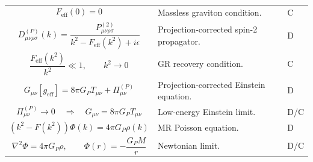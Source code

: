 \documentclass[11pt]{article}
\newcommand{\eff}{\mathrm{eff}}
\begin{document}
\begin{longtable}{>{\raggedright\arraybackslash}p{} >{\raggedright\arraybackslash}p{} >{\centering\arraybackslash}p{}}
\begin{equation}
F_{\eff}(0)=0
\end{equation}
& Massless graviton condition. & C \\

\begin{equation}
D_{\mu\nu\rho\sigma}^{(P)}(k)=\frac{P^{(2)}_{\mu\nu\rho\sigma}}{k^2-F_{\eff}(k^2)+i\epsilon}
\end{equation}
& Projection-corrected spin-2 propagator. & D \\

\begin{equation}
\frac{F_{\eff}(k^2)}{k^2}\ll1,\qquad k^2\rightarrow0
\end{equation}
& GR recovery condition. & C \\

\begin{equation}
G_{\mu\nu}[g_{\eff}]=8\pi G_P T_{\mu\nu}+\Pi_{\mu\nu}^{(P)}
\end{equation}
& Projection-corrected Einstein equation. & D \\

\begin{equation}
\Pi_{\mu\nu}^{(P)}\rightarrow0\quad\Rightarrow\quad G_{\mu\nu}=8\pi G_PT_{\mu\nu}
\end{equation}
& Low-energy Einstein limit. & D/C \\

\begin{equation}
(k^2-F(k^2))\Phi(k)=4\pi G_P\rho(k)
\end{equation}
& MR Poisson equation. & D \\

\begin{equation}
\nabla^2\Phi=4\pi G_P\rho,
\qquad
\Phi(r)=-\frac{G_PM}{r}
\end{equation}
& Newtonian limit. & D/C \\

\bottomrule
\end{longtable}
\end{document}
